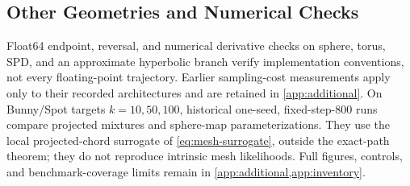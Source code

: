 \subsection{Other Geometries and Numerical Checks}
Float64 endpoint, reversal, and numerical derivative checks on sphere, torus, SPD, and an approximate hyperbolic branch verify implementation conventions, not every floating-point trajectory. Earlier sampling-cost measurements apply only to their recorded architectures and are retained in \cref{app:additional}. On Bunny/Spot targets $k=10,50,100$, historical one-seed, fixed-step-800 runs compare projected mixtures and sphere-map parameterizations. They use the local projected-chord surrogate of \cref{eq:mesh-surrogate}, outside the exact-path theorem; they do not reproduce intrinsic mesh likelihoods. Full figures, controls, and benchmark-coverage limits remain in \cref{app:additional,app:inventory}.

